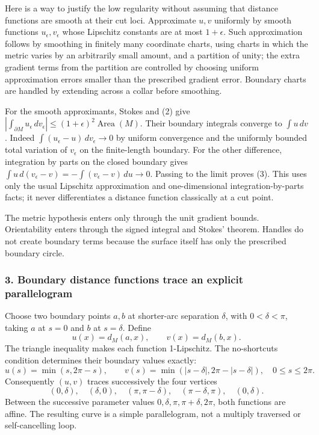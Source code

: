 \documentclass[11pt]{article}
\begin{document}
Here is a way to justify the low regularity without assuming that distance functions are smooth at their cut loci. Approximate $u,v$ uniformly by smooth functions $u_\epsilon,v_\epsilon$ whose Lipschitz constants are at most $1+\epsilon$. Such approximation follows by smoothing in finitely many coordinate charts, using charts in which the metric varies by an arbitrarily small amount, and a partition of unity; the extra gradient terms from the partition are controlled by choosing uniform approximation errors smaller than the prescribed gradient error. Boundary charts are handled by extending across a collar before smoothing.

For the smooth approximants, Stokes and (2) give
$|\int_{\partial M}u_\epsilon\,dv_\epsilon|\le(1+\epsilon)^2\operatorname{Area}(M)$. Their boundary integrals converge to $\int u\,dv$. Indeed
$\int(u_\epsilon-u)\,dv_\epsilon\to0$ by uniform convergence and the uniformly bounded total variation of $v_\epsilon$ on the finite-length boundary. For the other difference, integration by parts on the closed boundary gives
$\int u\,d(v_\epsilon-v)=-\int(v_\epsilon-v)\,du\to0$.
Passing to the limit proves (3). This uses only the usual Lipschitz approximation and one-dimensional integration-by-parts facts; it never differentiates a distance function classically at a cut point.

The metric hypothesis enters only through the unit gradient bounds. Orientability enters through the signed integral and Stokes' theorem. Handles do not create boundary terms because the surface itself has only the prescribed boundary circle.

\subsubsection{3. Boundary distance functions trace an explicit parallelogram}
Choose two boundary points $a,b$ at shorter-arc separation $\delta$, with $0<\delta<\pi$, taking $a$ at $s=0$ and $b$ at $s=\delta$. Define
\[
 u(x)=d_M(a,x),\qquad v(x)=d_M(b,x).
\]
The triangle inequality makes each function 1-Lipschitz. The no-shortcuts condition determines their boundary values exactly:
\[
 u(s)=\min(s,2\pi-s),\qquad
 v(s)=\min(|s-\delta|,2\pi-|s-\delta|),\quad0\le s\le2\pi.
                                                               \tag{4}
\]
Consequently $(u,v)$ traces successively the four vertices
\[
 (0,\delta),\quad(\delta,0),\quad(\pi,\pi-\delta),
 \quad(\pi-\delta,\pi),\quad(0,\delta).                \tag{5}
\]
Between the successive parameter values $0,\delta,\pi,\pi+\delta,2\pi$, both functions are affine. The resulting curve is a simple parallelogram, not a multiply traversed or self-cancelling loop.
\end{document}
